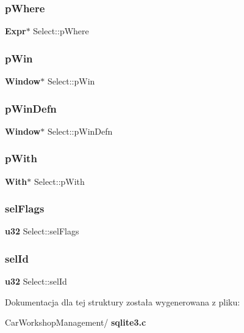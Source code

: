 \mbox{\label{struct_select_a0562c1e19acde263a04af015611d8ce8}} 
\subsubsection{pWhere}
{\footnotesize\ttfamily \textbf{ Expr}$\ast$ Select\+::p\+Where}

\mbox{\label{struct_select_a889318acfd86178c99d077b3732ee862}} 
\subsubsection{pWin}
{\footnotesize\ttfamily \textbf{ Window}$\ast$ Select\+::p\+Win}

\mbox{\label{struct_select_ac71ebf119d0f86761a5f77ed5c447ff7}} 
\subsubsection{pWinDefn}
{\footnotesize\ttfamily \textbf{ Window}$\ast$ Select\+::p\+Win\+Defn}

\mbox{\label{struct_select_a3ab5597bdc6b219ea03a6aca93260e9f}} 
\subsubsection{pWith}
{\footnotesize\ttfamily \textbf{ With}$\ast$ Select\+::p\+With}

\mbox{\label{struct_select_a8114a0684cb5f38d5f6ef3855114c928}} 
\subsubsection{selFlags}
{\footnotesize\ttfamily \textbf{ u32} Select\+::sel\+Flags}

\mbox{\label{struct_select_ad61ba11e4ee07895d067354f6ea02d39}} 
\subsubsection{selId}
{\footnotesize\ttfamily \textbf{ u32} Select\+::sel\+Id}



Dokumentacja dla tej struktury została wygenerowana z pliku\+:\begin{DoxyCompactItemize}
\item 
Car\+Workshop\+Management/\textbf{ sqlite3.\+c}\end{DoxyCompactItemize}
